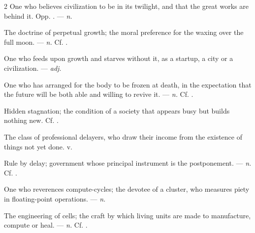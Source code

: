 \begin{multicols}{2}
 One who believes civilization to be in its twilight, and that the great works are behind it. Opp. . —  \textit{n.}

 The doctrine of perpetual growth; the moral preference for the waxing over the full moon. —  \textit{n.} Cf. .

 One who feeds upon growth and starves without it, as a startup, a city or a civilization. —  \textit{adj.}

 One who has arranged for the body to be frozen at death, in the expectation that the future will be both able and willing to revive it. —  \textit{n.} Cf. .

 Hidden stagnation; the condition of a society that appears busy but builds nothing new. Cf. .

 The class of professional delayers, who draw their income from the existence of things not yet done.   v.

 Rule by delay; government whose principal instrument is the postponement. —  \textit{n.} Cf. .

 One who reverences compute-cycles; the devotee of a cluster, who measures piety in floating-point operations. —  \textit{n.}

 The engineering of cells; the craft by which living units are made to manufacture, compute or heal.  —  \textit{n.} Cf. .

\end{multicols}

